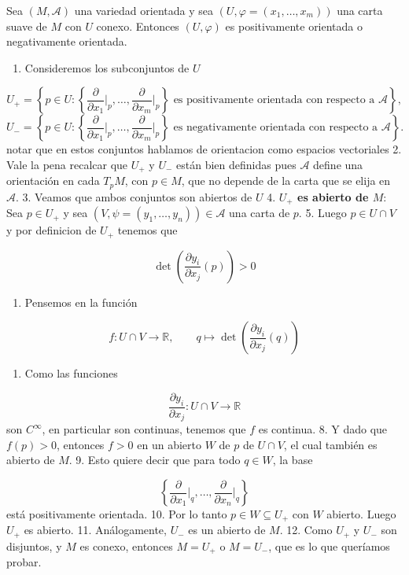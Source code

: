 \begin{bookproposition}{}
Sea $(M,\mathcal A)$ una variedad orientada y sea $(U,\varphi=(x_1,\ldots,x_m))$ una carta suave de $M$ con $U$ conexo. Entonces $(U,\varphi)$ es positivamente orientada o negativamente orientada.

\end{bookproposition}
\begin{bookproof}{}
\begin{enumerate}
\item Consideremos los subconjuntos de $U$
\end{enumerate}
\[
U_+=\left\{p\in U:\left\{\frac{\partial}{\partial x_1}\bigg|_p,\ldots,\frac{\partial}{\partial x_m}\bigg|_p\right\}\text{ es positivamente orientada con respecto a } \mathcal A\right\},
\]
\[
U_-=\left\{p\in U:\left\{\frac{\partial}{\partial x_1}\bigg|_p,\ldots,\frac{\partial}{\partial x_m}\bigg|_p\right\}\text{ es negativamente orientada con respecto a }\mathcal A\right\}.
\]
notar que en estos conjuntos hablamos de orientacion como espacios vectoriales 2. Vale la pena recalcar que $U_{+}$ y $U_{-}$ están bien definidas pues $\mathcal A$ define una orientación en cada $T_pM$, con $p\in M$, que no depende de la carta que se elija en $\mathcal A$. 3. Veamos que ambos conjuntos son abiertos de $U$ 4. \textbf{$U_{+}$ es abierto de $M$}: Sea $p\in U_+$ y sea $(V,\psi=(y_1,\ldots,y_n))\in\mathcal A$ una carta de $p$. 5. Luego $p\in U\cap V$ y por definicion de $U_{+}$ tenemos que

\[
\det\!\left(\frac{\partial y_i}{\partial x_j}(p)\right)>0
\]
\begin{enumerate}[start=6]
\item Pensemos en la función
\end{enumerate}
\[
f:U\cap V\longrightarrow\mathbb R,\qquad q\longmapsto \det\!\left(\frac{\partial y_i}{\partial x_j}(q)\right)
\]
\begin{enumerate}[start=7]
\item Como las funciones
\end{enumerate}
\[
\frac{\partial y_i}{\partial x_j}:U\cap V\to\mathbb R
\]
son $C^\infty$, en particular son continuas, tenemos que $f$ es continua. 8. Y dado que $f(p)>0$, entonces $f>0$ en un abierto $W$ de $p$ de $U\cap V$, el cual también es abierto de $M$. 9. Esto quiere decir que para todo $q\in W$, la base

\[
\left\{\frac{\partial}{\partial x_1}\bigg|_q,\ldots,\frac{\partial}{\partial x_n}\bigg|_q\right\}
\]
está positivamente orientada. 10. Por lo tanto $p\in W\subseteq U_{+}$ con $W$ abierto. Luego $U_{+}$ es abierto. 11. Análogamente, $U_{-}$ es un abierto de $M$. 12. Como $U_{+}$ y $U_{-}$ son disjuntos, y $M$ es conexo, entonces $M=U_{+}$ o $M=U_{-}$, que es lo que queríamos probar.

\bookqed
\end{bookproof}
